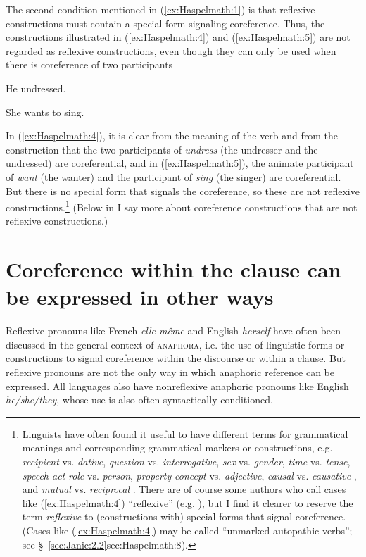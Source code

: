 \documentclass[output=paper]{langscibook}
\begin{document}
The second condition mentioned in (\ref{ex:Haspelmath:1}) is that reflexive constructions must contain a special form signaling coreference. Thus, the constructions illustrated in (\ref{ex:Haspelmath:4}) and (\ref{ex:Haspelmath:5}) are not regarded as reflexive constructions, even though they can only be used when there is coreference of two participants 

\ea   \label{ex:Haspelmath:4}
    {He} {undressed.}
\z

\ea \label{ex:Haspelmath:5}
    {She} {wants} {to} {sing.}
\z 

In (\ref{ex:Haspelmath:4}), it is clear from the meaning of the verb and from the construction that the two participants of \textit{undress} (the undresser and the undressed) are coreferential, and in (\ref{ex:Haspelmath:5}), the animate participant of \textit{want} (the wanter) and the participant of \textit{sing} (the singer) are coreferential. But there is no special form that signals the coreference, so these are not reflexive constructions.\footnote{{Linguists have often found it useful to have different terms for grammatical meanings and corresponding grammatical markers or constructions, e.g.} {\textit{recipient}} {vs.} {\textit{dative}}, {\textit{question}} {vs.} {\textit{interrogative}}, {\textit{sex}} {vs.} {\textit{gender}}, {\textit{time}} {vs.} {\textit{tense}}, {\textit{speech-act} \textit{role}} {vs.} {\textit{person}}, {\textit{property} \textit{concept}} {vs.} {\textit{adjective}}, {\textit{causal}} {vs.} {\textit{causative}} {\citep{Haspelmath2016}, and} {\textit{mutual}} {vs.} {\textit{reciprocal}} {\citep{Haspelmath2007}. There are of course some authors who call cases like (\ref{ex:Haspelmath:4}) “reflexive” (e.g. \citealt{Reinhart1993}), but I find it clearer to reserve the term} {\textit{reflexive}} {to (constructions with) special forms that signal coreference. (Cases like (\ref{ex:Haspelmath:4}) may be called “unmarked autopathic verbs”; see \S~\ref{sec:Janic:2.2}{sec:Haspelmath:8}).}} (Below in  I say more about coreference constructions that are not reflexive constructions.)


\section{Coreference within the clause can be expressed in other ways}\label{sec:Haspelmath:4}

Reflexive pronouns like French \textit{elle-même} and English \textit{herself} have often been discussed in the general context of \textsc{anaphora}, i.e. the use of linguistic forms or constructions to signal coreference within the discourse or within a clause. But reflexive pronouns are not the only way in which anaphoric reference can be expressed.  All languages also have nonreflexive anaphoric pronouns like English \textit{he/she/they}, whose use is also often syntactically conditioned. 
\end{document}

